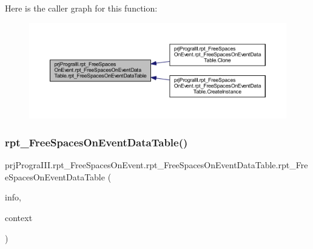 Here is the caller graph for this function\+:
\nopagebreak
\begin{figure}[H]
\begin{center}
\leavevmode
\includegraphics[width=350pt]{classprj_progra_i_i_i_1_1rpt___free_spaces_on_event_1_1rpt___free_spaces_on_event_data_table_aa803fe17d013c848d1954f2675af80ee_icgraph}
\end{center}
\end{figure}
\hypertarget{classprj_progra_i_i_i_1_1rpt___free_spaces_on_event_1_1rpt___free_spaces_on_event_data_table_a73ebc684d86a88c0c4b49ec031584ec5}{}\label{classprj_progra_i_i_i_1_1rpt___free_spaces_on_event_1_1rpt___free_spaces_on_event_data_table_a73ebc684d86a88c0c4b49ec031584ec5} 
\subsubsection{\texorpdfstring{rpt\+\_\+\+Free\+Spaces\+On\+Event\+Data\+Table()}{rpt\_FreeSpacesOnEventDataTable()}\hspace{0.1cm}{\footnotesize\ttfamily [2/2]}}
{\footnotesize\ttfamily prj\+Progra\+I\+I\+I.\+rpt\+\_\+\+Free\+Spaces\+On\+Event.\+rpt\+\_\+\+Free\+Spaces\+On\+Event\+Data\+Table.\+rpt\+\_\+\+Free\+Spaces\+On\+Event\+Data\+Table (\begin{DoxyParamCaption}\item[{global\+::\+System.\+Runtime.\+Serialization.\+Serialization\+Info}]{info,  }\item[{global\+::\+System.\+Runtime.\+Serialization.\+Streaming\+Context}]{context }\end{DoxyParamCaption})\hspace{0.3cm}{\ttfamily [protected]}}



